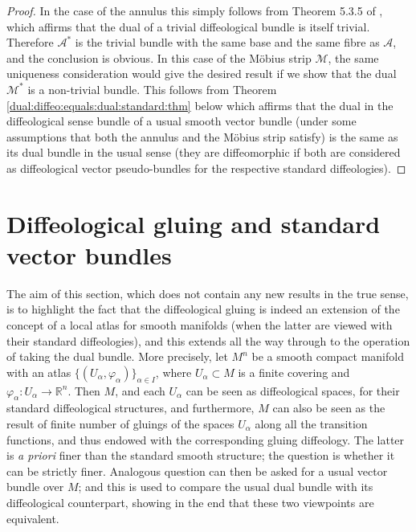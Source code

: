 \documentclass{article}
\newcommand\matR{{\mathbb{R}}}
\begin{document}
\begin{proof}
In the case of the annulus this simply follows from Theorem 5.3.5 of \cite{vincent}, which affirms that the dual of a trivial diffeological bundle is itself trivial. Therefore $\mathcal{A}^*$ is the trivial bundle with 
the same base and the same fibre as $\mathcal{A}$, and the conclusion is obvious. In this case of the M\"obius strip $\mathcal{M}$, the same uniqueness consideration would give the desired result if we 
show that the dual $\mathcal{M}^*$ is a non-trivial bundle. This follows from Theorem \ref{dual:diffeo:equals:dual:standard:thm} below which affirms that the dual in the diffeological sense bundle of a usual 
smooth vector bundle (under some assumptions that both the annulus and the M\"obius strip satisfy) is the same as its dual bundle in the usual sense (they are diffeomorphic if both are considered as
diffeological vector pseudo-bundles for the respective standard diffeologies).
\end{proof}



\section{Diffeological gluing and standard vector bundles}

The aim of this section, which does not contain any new results in the true sense, is to highlight the fact that the diffeological gluing is indeed an extension of the concept of a local atlas for smooth manifolds 
(when the latter are viewed with their standard diffeologies), and this extends all the way through to the operation of taking the dual bundle. More precisely, let $M^n$ be a smooth compact manifold with an 
atlas $\{(U_{\alpha},\varphi_{\alpha})\}_{\alpha\in I}$, where $U_{\alpha}\subset M$ is a finite covering and $\varphi_{\alpha}:U_{\alpha}\to\matR^n$. Then $M$, and each $U_{\alpha}$ can be seen as 
diffeological spaces, for their standard diffeological structures, and furthermore, $M$ can also be seen as the result of finite number of gluings of the spaces $U_{\alpha}$ along all the transition functions, and 
thus endowed with the corresponding gluing diffeology. The latter is \emph{a priori} finer than the standard smooth structure; the question is whether it can be strictly finer. Analogous question can then be 
asked for a usual vector bundle over $M$; and this is used to compare the usual dual bundle with its diffeological counterpart, showing in the end that these two viewpoints are equivalent.
\end{document}
